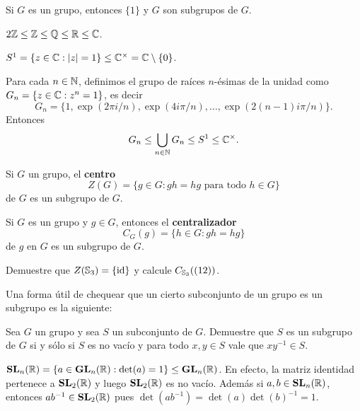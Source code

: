 \begin{example}
	Si $G$ es un grupo, entonces $\{1\}$ y $G$ son subgrupos de $G$. 
\end{example}

\begin{example}
$2\mathbb{Z}\leq\mathbb{Z}\leq\mathbb{Q}\leq\mathbb{R}\leq\mathbb{C}$. 	
\end{example}

\begin{example}
$S^1=\{z\in\mathbb{C}:|z|=1\}\leq\mathbb{C}^\times=\mathbb{C}\setminus\{0\}$.
\end{example}

\begin{example}
Para cada $n\in\mathbb{N}$, definimos el grupo de raíces $n$-ésimas de la unidad como $G_n=\{z\in\mathbb{C}:z^n=1\}$, es decir 
\[
G_n=\{1,\exp(2\pi i/n),\exp(4i\pi/n),\dots,\exp(2(n-1)i\pi/n)\}.
\]
Entonces
\[
G_n\leq\bigcup_{n\in\mathbb{N}}G_n\leq S^1\leq\mathbb{C}^\times.
\]
\end{example}

\begin{exercise}
	Si $G$ un grupo, el \textbf{centro} 
	\[
		Z(G)=\{g\in G:gh=hg\text{ para todo	$h\in G$}\}
	\]
	de $G$ es un subgrupo de $G$.
\end{exercise}

\begin{exercise}
	Si $G$ es un grupo y $g\in G$, entonces el \textbf{centralizador} 
	\[
		C_G(g)=\{h\in G:gh=hg\} 
	\]
	de $g$ en $G$ es un subgrupo de $G$.
\end{exercise}

\begin{exercise}
Demuestre que $Z(\mathbb{S}_3)=\{\operatorname{id}\}$ y calcule $C_{\mathbb{S}_3}((12))$. 
\end{exercise}

Una forma útil de chequear que un cierto subconjunto de un grupo 
es un subgrupo es la siguiente:

\begin{exercise}
	Sea $G$ un grupo y sea $S$ un subconjunto de $G$. Demuestre que $S$ es un subgrupo
	de $G$ si y sólo si $S$ es no vacío y para todo $x,y\in S$ vale que $xy^{-1}\in S$. 
\end{exercise}

\begin{example}
$\mathbf{SL}_n(\mathbb{R})=\{a\in\mathbf{GL}_n(\mathbb{R}):\det(a)=1\}\leq\mathbf{GL}_n(\mathbb{R})$. En efecto, la matriz identidad pertenece a $\mathbf{SL}_2(\mathbb{R})$ y luego $\mathbf{SL}_2(\mathbb{R})$ es no vacío. Además si $a,b\in\mathbf{SL}_n(\mathbb{R})$, 
entonces $ab^{-1}\in\mathbf{SL}_2(\mathbb{R})$ pues $\det(ab^{-1})=\det(a)\det(b)^{-1}=1	$. 
\end{example}

